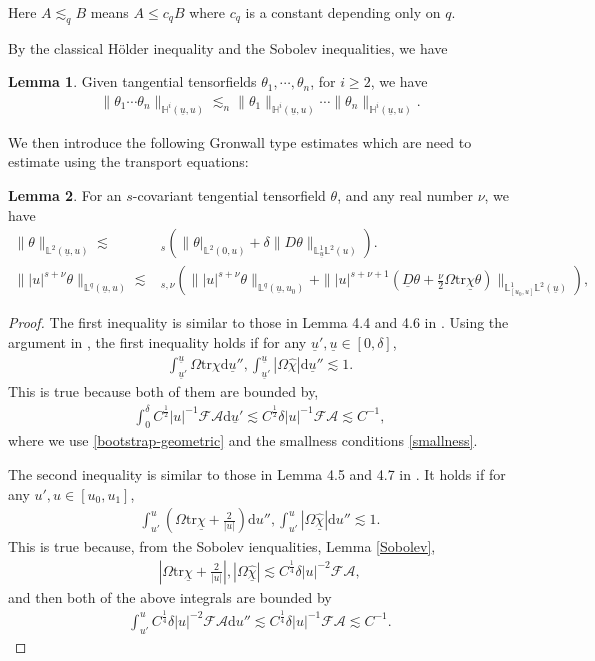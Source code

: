 \documentclass[11pt,reqno]{amsart}
\theoremstyle{definition}
\newtheorem{lemma}{Lemma}[section]
\numberwithin{equation}{section}
\newcommand{\D}{\mathrm{d}}
\newcommand{\tr}{\mathrm{tr}}
\renewcommand{\L}{\mathbb{L}}
\renewcommand{\H}{\mathbb{H}}
\def\chib{\underline{\chi}}
\def\chibh{\widehat{\underline{\chi}}}
\def\chih{\widehat{\chi}}
\def\tr{\mathrm{tr}}
\def\ub{\underline{u}}
\newcommand{\Db}{\underline{D}}
\begin{document}
Here $A\lesssim_q B$ means $A\le c_qB$ where $c_q$ is a constant depending only on $q$.


By the classical H\"older inequality and the Sobolev inequalities, we have
\begin{lemma}\label{Holder}
Given tangential tensorfields $\theta_1,\cdots,\theta_n$, for $i\ge2$, we have
\begin{align*}
\|\theta_1\cdots\theta_n\|_{\H^i(\ub,u)}\lesssim_n\|\theta_1\|_{\H^i(\ub,u)}\cdots\|\theta_n\|_{\H^i(\ub,u)}.
\end{align*}
\end{lemma}


We then introduce the following Gronwall type estimates which are need to estimate using the transport equations:
\begin{lemma}\label{Gronwall}
For an $s$-covariant tengential tensorfield $\theta$, and any real number $\nu$, we have
\begin{align*}
\|\theta\|_{\L^2(\ub,u)}
\lesssim&_s \left(\|\theta|_{\L^2(0,u)}+\delta\|D\theta\|_{\L_{\ub}^1\L^2(u)}\right).\\
\||u|^{s+\nu}\theta\|_{\L^q(\ub,u)}\lesssim&_{s,\nu}\left(\||u|^{s+\nu}\theta\|_{\L^q(\ub,u_0)}+\||u|^{s+\nu+1}(\Db\theta+\frac{\nu}{2}\Omega\tr\chib\theta)\|_{\L^1_{[u_0,u]}\L^2(\ub)}\right),
\end{align*}\end{lemma}
\begin{proof}
The first inequality is similar to those in Lemma 4.4 and 4.6 in \cite{Chr}. Using the argument in \cite{Chr}, the first inequality holds if for any $\ub',\ub\in[0,\delta]$,
\begin{align*}
\int_{\ub'}^{\ub}\Omega\tr\chi\D \ub'', \int_{\ub'}^{\ub}|\Omega\chih|\D \ub''\lesssim1.
\end{align*}
This is true because both of them are bounded by, 
\begin{align*}
\int_0^\delta C^{\frac{1}{2}}|u|^{-1}\mathscr{F}\mathcal{A}\D\ub'\lesssim C^{\frac{1}{2}}\delta|u|^{-1}\mathscr{F}\mathcal{A}\lesssim C^{-1},
\end{align*}
where we use \eqref{bootstrap-geometric} and the smallness conditions \eqref{smallness}.

The second inequality is similar to those in Lemma 4.5 and 4.7 in \cite{Chr}. It holds if for any $u',u\in[u_0,u_1]$,
\begin{align*}
\int_{u'}^u\left(\Omega\tr\chib+\frac{2}{|u|}\right)\D u'', \int_{u'}^u|\Omega\chibh|\D u''\lesssim1.
\end{align*}
This is true because, from the Sobolev ienqualities, Lemma \ref{Sobolev},
\begin{align*}
\left|\Omega\tr\chib+\frac{2}{|u|}\right|, |\Omega\chibh|\lesssim C^{\frac{1}{4}}\delta|u|^{-2}\mathscr{F}\mathcal{A},
\end{align*}
and then both of the above integrals are bounded by
\begin{align*}
\int_{u'}^{u}C^{\frac{1}{4}}\delta|u|^{-2}\mathscr{F}\mathcal{A}\D u''\lesssim C^{\frac{1}{4}}\delta|u|^{-1}\mathscr{F}\mathcal{A}\lesssim C^{-1}.
\end{align*}
\end{proof}
\end{document}
